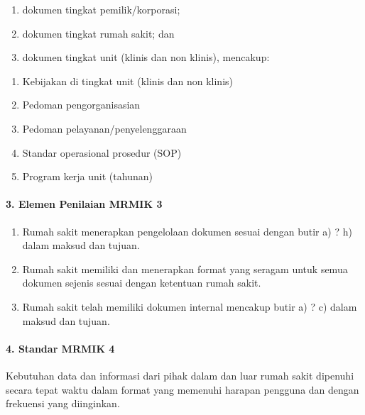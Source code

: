 \documentclass[
]{book}
\providecommand{\tightlist}{%
  \setlength{\itemsep}{0pt}\setlength{\parskip}{0pt}}
\begin{document}
\begin{enumerate}
\def\labelenumi{\alph{enumi}.}
\tightlist
\item
  dokumen tingkat pemilik/korporasi;
\item
  dokumen tingkat rumah sakit; dan
\item
  dokumen tingkat unit (klinis dan non klinis), mencakup:
\end{enumerate}

\begin{enumerate}
\def\labelenumi{\arabic{enumi}.}
\tightlist
\item
  Kebijakan di tingkat unit (klinis dan non klinis)
\item
  Pedoman pengorganisasian
\item
  Pedoman pelayanan/penyelenggaraan
\item
  Standar operasional prosedur (SOP)
\item
  Program kerja unit (tahunan)
\end{enumerate}

\hypertarget{elemen-penilaian-mrmik-3}{%
\paragraph*{3. Elemen Penilaian MRMIK 3}\label{elemen-penilaian-mrmik-3}}

\begin{enumerate}
\def\labelenumi{\alph{enumi}.}
\tightlist
\item
  Rumah sakit menerapkan pengelolaan dokumen sesuai dengan butir a) ? h) dalam maksud dan tujuan.
\item
  Rumah sakit memiliki dan menerapkan format yang seragam untuk semua dokumen sejenis sesuai dengan ketentuan rumah sakit.
\item
  Rumah sakit telah memiliki dokumen internal mencakup butir a) ? c) dalam maksud dan tujuan.
\end{enumerate}

\hypertarget{standar-mrmik-4}{%
\paragraph*{4. Standar MRMIK 4}\label{standar-mrmik-4}}

Kebutuhan data dan informasi dari pihak dalam dan luar rumah sakit dipenuhi secara tepat waktu dalam format yang memenuhi harapan pengguna dan dengan frekuensi yang diinginkan.
\end{document}
